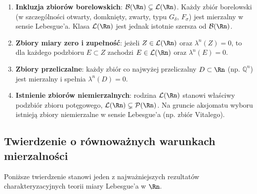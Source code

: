 \begin{tw}
    \leavevmode
    \begin{enumerate}

        \item \textbf{Inkluzja zbiorów borelowskich}: $\mathcal{B}(\Rn) \subsetneq \mathcal{L}(\Rn)$. Każdy zbiór borelowski (w szczególności otwarty, domknięty, zwarty, typu $G_\delta$, $F_\sigma$) jest mierzalny w sensie Lebesgue'a. Klasa $\mathcal{L}(\Rn)$ jest jednak istotnie szersza od $\mathcal{B}(\Rn)$.

        \item \textbf{Zbiory miary zero i zupełność}: jeżeli $Z \in \mathcal{L}(\Rn)$ oraz $\lambda^n(Z) = 0$, to dla każdego podzbioru $E \subset Z$ zachodzi $E \in \mathcal{L}(\Rn)$ oraz $\lambda^n(E) = 0$.

        \item \textbf{Zbiory przeliczalne}: każdy zbiór co najwyżej przeliczalny $D \subset \Rn$ (np. $\mathbb{Q}^n$) jest mierzalny i spełnia $\lambda^n(D) = 0$.

        \item \textbf{Istnienie zbiorów niemierzalnych}: rodzina $\mathcal{L}(\Rn)$ stanowi właściwy podzbiór zbioru potęgowego, $\mathcal{L}(\Rn) \subsetneq \mathcal{P}(\Rn)$. Na gruncie aksjomatu wyboru istnieją zbiory niemierzalne w sensie Lebesgue'a (np. zbiór Vitalego).

    \end{enumerate}
\end{tw}

\subsection{Twierdzenie o równoważnych warunkach mierzalności}

Poniższe twierdzenie stanowi jeden z najważniejszych rezultatów charakteryzacyjnych teorii miary Lebesgue'a w $\Rn$.

